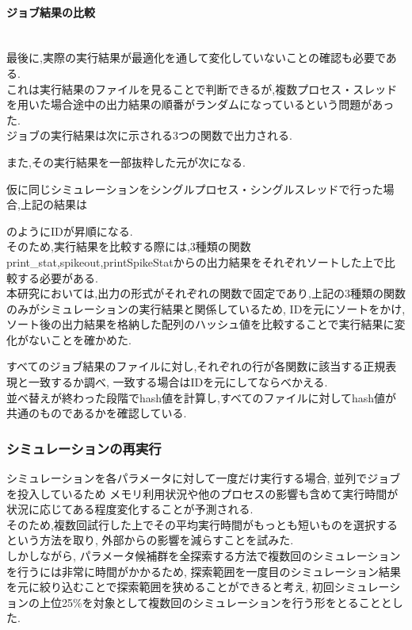 \paragraph{ジョブ結果の比較}~\\
最後に,実際の実行結果が最適化を通して変化していないことの確認も必要である.\\
これは実行結果のファイルを見ることで判断できるが,複数プロセス・スレッドを用いた場合途中の出力結果の順番がランダムになっているという問題があった.\\
ジョブの実行結果は次に示される3つの関数で出力される.\\
{\footnotesize

}
また,その実行結果を一部抜粋した元が次になる.\\
{\footnotesize

}
仮に同じシミュレーションをシングルプロセス・シングルスレッドで行った場合,上記の結果は
{\footnotesize

}
のようにIDが昇順になる.\\
そのため,実行結果を比較する際には,3種類の関数print\_stat,spikeout,printSpikeStatからの出力結果をそれぞれソートした上で比較する必要がある.\\
本研究においては,出力の形式がそれぞれの関数で固定であり,上記の3種類の関数のみがシミュレーションの実行結果と関係しているため,
IDを元にソートをかけ,ソート後の出力結果を格納した配列のハッシュ値を比較することで実行結果に変化がないことを確かめた.\\
{\footnotesize

}
すべてのジョブ結果のファイルに対し,それぞれの行が各関数に該当する正規表現と一致するか調べ,
一致する場合はIDを元にしてならべかえる.\\
並べ替えが終わった段階でhash値を計算し,すべてのファイルに対してhash値が共通のものであるかを確認している.\\



\subsubsection{シミュレーションの再実行}
シミュレーションを各パラメータに対して一度だけ実行する場合, 並列でジョブを投入しているため
メモリ利用状況や他のプロセスの影響も含めて実行時間が状況に応じてある程度変化することが予測される.\\
そのため,複数回試行した上でその平均実行時間がもっとも短いものを選択するという方法を取り,
外部からの影響を減らすことを試みた.\\
しかしながら, パラメータ候補群を全探索する方法で複数回のシミュレーションを行うには非常に時間がかかるため,
探索範囲を一度目のシミュレーション結果を元に絞り込むことで探索範囲を狭めることができると考え,
初回シミュレーションの上位25\%を対象として複数回のシミュレーションを行う形をとることとした.\\
